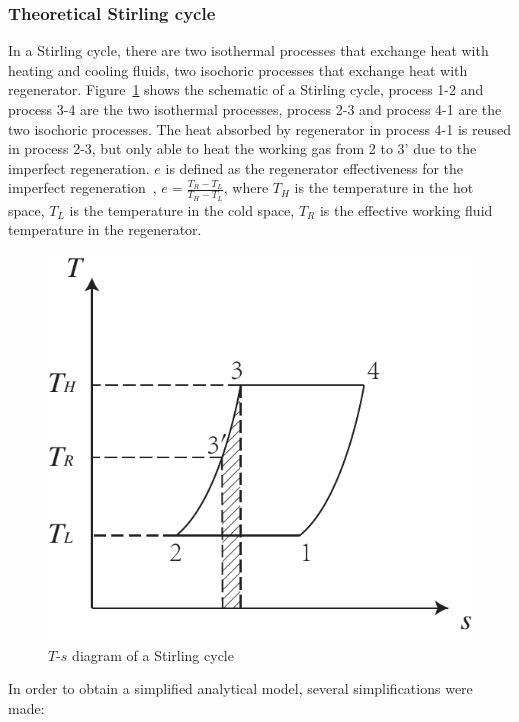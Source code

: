 \documentclass[review,3p,10t]{elsarticle}
\begin{document}
\subsubsection{Theoretical Stirling cycle}
In a Stirling cycle, there are two isothermal processes that exchange heat with heating and cooling fluids, two isochoric processes that exchange heat with regenerator. Figure~\ref{fig:StirlingCycle} shows the schematic of a Stirling cycle, process 1-2 and process 3-4 are the two isothermal processes, process 2-3 and process 4-1 are the two isochoric processes. The heat absorbed by regenerator in process 4-1 is reused in process 2-3, but only able to heat the working gas from 2 to 3' due to the imperfect regeneration. $e$ is defined as the regenerator effectiveness for the imperfect regeneration~\cite{Formosa2010}, $e=\frac{T_R-T_L}{T_H-T_L}$, where $T_H$ is the temperature in the hot space, $T_L$ is the temperature in the cold space, $T_R$ is the effective working fluid temperature in the regenerator.

\noindent \begin{figure}[htbp]
\begin{center}
	\includegraphics[width = 0.7\columnwidth]{./graphics/StirlingCycle}
	\caption{$T$-$s$ diagram of a Stirling cycle}
	\label{fig:StirlingCycle}
\end{center}
\end{figure}

In order to obtain a simplified analytical model, several simplifications were made:
\end{document}
